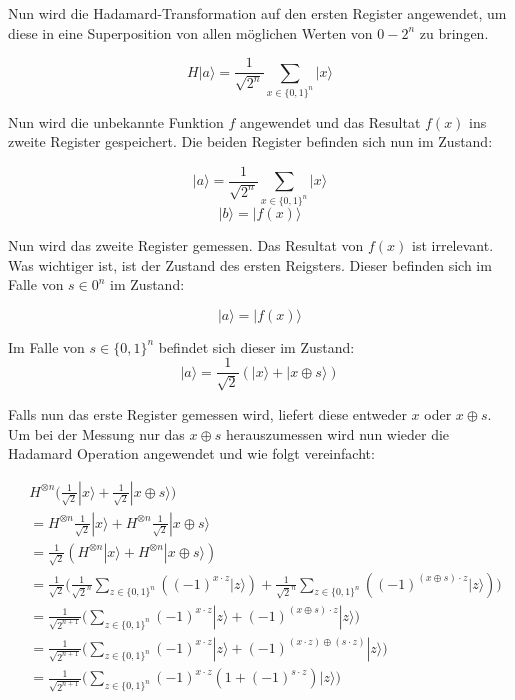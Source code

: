 \begin{refsection}
Nun wird die Hadamard-Transformation auf den ersten Register
angewendet, um diese in eine Superposition von allen möglichen Werten von $0
- 2^n$ zu bringen.  

\[ 
    H|a\rangle=\frac{1}{\sqrt{2^n}} \sum_{x\in\{0,1\}^n}{|x\rangle}
\]
 
Nun wird die unbekannte Funktion $f$ angewendet und das Resultat $f(x)$ ins
zweite Register gespeichert. Die beiden Register befinden sich nun im Zustand:

\[ 
    |a\rangle = \frac{1}{\sqrt{2^n}} \sum_{x\in\{0,1\}^n} {|x\rangle} 
\]
\[
    |b\rangle = |f(x)\rangle
\]

Nun wird das zweite Register gemessen. Das Resultat von $f(x)$ ist irrelevant.
Was wichtiger ist, ist der Zustand des ersten Reigsters.  Dieser befinden sich
im Falle von $s\in0^n$ im Zustand:

\[
    |a\rangle = |f(x)\rangle
\]

Im Falle von $s \in \{0,1\}^n$ befindet sich dieser im Zustand:
\[
    |a\rangle = \frac{1}{\sqrt{2}} ( |x\rangle + |x \oplus s \rangle )
\]

Falls nun das erste Register gemessen wird, liefert diese entweder $x$ oder $x
\oplus s$. Um bei der Messung nur das $x \oplus s$ herauszumessen wird nun
wieder die Hadamard Operation angewendet und wie folgt vereinfacht:

\begin{align*}
    &H^{ \otimes n } \biggl( 
                     \frac{1}{\sqrt{2}} |x\rangle + 
                     \frac{1}{\sqrt{2}} |x \oplus s\rangle 
                     \biggr)
    \\
    &= H^{ \otimes n } \frac{1}{\sqrt{2}} |x\rangle + 
       H^{ \otimes n } \frac{1}{\sqrt{2}} |x \oplus s\rangle 
    \\ 
    &= \frac1{\sqrt{2}} ( H^{ \otimes n } |x\rangle + H^{ \otimes n } |x \oplus s\rangle )
    \\
    &= \frac1{\sqrt{2}}
       \biggl( \frac1{\sqrt{2}^n} \sum_{z \in \{0,1\}^n} {( (-1)^{x \cdot z} |z\rangle )} + 
               \frac1{\sqrt{2}^n}  \sum_{z \in \{0,1\}^n} { ( (-1)^{(x \oplus s) \cdot z } |z\rangle)}
       \biggr)
    \\
    &= \frac1{\sqrt{2^{n + 1}}}
       \biggl( \sum_{z \in \{0,1\}^n}  { 
                   (-1)^{x \cdot z} |z\rangle + (-1)^{(x \oplus s) \cdot z } |z\rangle 
               } 
       \biggr)
    \\
    &= \frac1{\sqrt{2^{n + 1}}}
       \biggl( \sum_{z \in \{0,1\}^n}  { 
                  (-1)^{x \cdot z} |z\rangle + (-1)^{(x \cdot z) \oplus ( s \cdot z) } |z\rangle 
               } 
       \biggr)
    \\
    &= \frac1{\sqrt{2^{n + 1}}}
       \biggl( 
          \sum_{z \in \{0,1\}^n}  { (-1)^{x \cdot z} ( 1 + (-1)^{ s \cdot z}) |z\rangle } 
       \biggr)
\end{align*}


\end{refsection}
